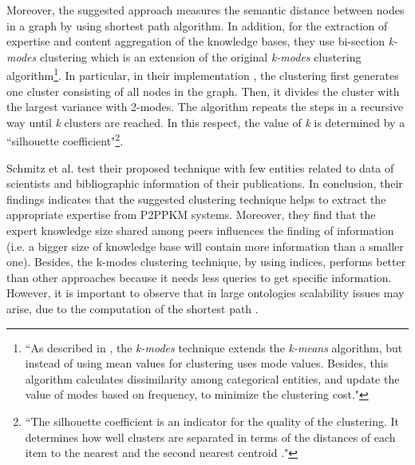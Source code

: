 \documentclass[runningheads]{llncs}
\begin{document}
Moreover, the suggested approach measures the semantic distance between nodes in a graph by using shortest path algorithm. In addition, for the extraction of expertise and content aggregation of the knowledge bases, they use bi-section {\textit{k-modes}} clustering which is an extension of the original {\textit{k-modes}} clustering algorithm\footnote{``As described in \cite{Huang}, the {\textit{k-modes}} technique extends the {\textit{k-means}} algorithm, but instead of using mean values for clustering uses mode values. Besides, this algorithm calculates dissimilarity among categorical entities, and update the value of modes based on frequency, to minimize the clustering cost."}. In particular, in their implementation \cite{Schmitz}, the clustering first generates one cluster consisting of all nodes in the graph. Then, it divides the cluster with the largest variance with 2-modes. The algorithm repeats the steps in a recursive way until {\textit{k}} clusters are reached. In this respect, the value of {\textit{k}} is determined by a ``silhouette coefficient"\footnote{``The silhouette coefficient is an indicator for the quality of the clustering. It determines how well clusters are separated in terms of the distances of each item to the nearest and the second nearest centroid \cite{Schmitz}."}.

Schmitz et al. \cite{Schmitz} test their proposed technique with few entities related to data of scientists and bibliographic information of their publications. In conclusion, their findings indicates that the suggested clustering technique helps to extract the appropriate expertise from P2PPKM systems. Moreover, they find that the expert knowledge size shared among peers influences the finding of information (i.e. a bigger size of knowledge base will contain more information than a smaller one). Besides, the k-modes clustering technique, by using indices, performs better than other approaches because it needs less queries to get specific information. 
However, it is important to observe that in large ontologies scalability issues may arise, due to the computation of the shortest path \cite{Schmitz}.
\end{document}
